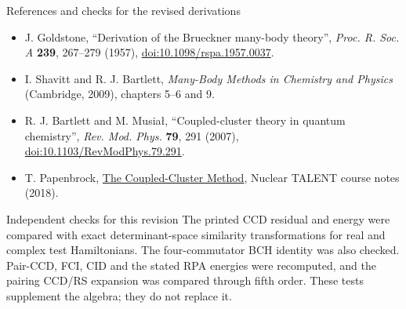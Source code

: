 \documentclass[aspectratio=169,10pt]{beamer}
\begin{document}
\begin{frame}{References and checks for the revised derivations}
\small
\begin{itemize}
\item J. Goldstone, ``Derivation of the Brueckner many-body theory'', \emph{Proc. R. Soc. A} \textbf{239}, 267--279 (1957), \href{https://doi.org/10.1098/rspa.1957.0037}{doi:10.1098/rspa.1957.0037}.
\item I. Shavitt and R. J. Bartlett, \emph{Many-Body Methods in Chemistry and Physics} (Cambridge, 2009), chapters 5--6 and 9.
\item R. J. Bartlett and M. Musia\l{}, ``Coupled-cluster theory in quantum chemistry'', \emph{Rev. Mod. Phys.} \textbf{79}, 291 (2007), \href{https://doi.org/10.1103/RevModPhys.79.291}{doi:10.1103/RevModPhys.79.291}.
\item T. Papenbrock, \href{https://nucleartalent.github.io/ManyBody2018/doc/pub/CCM/html/CCM.html}{The Coupled-Cluster Method}, Nuclear TALENT course notes (2018).
\end{itemize}
\begin{block}{Independent checks for this revision}
The printed CCD residual and energy were compared with exact determinant-space similarity transformations for real and complex test Hamiltonians. The four-commutator BCH identity was also checked. Pair-CCD, FCI, CID and the stated RPA energies were recomputed, and the pairing CCD/RS expansion was compared through fifth order. These tests supplement the algebra; they do not replace it.
\end{block}
\end{frame}
\end{document}
